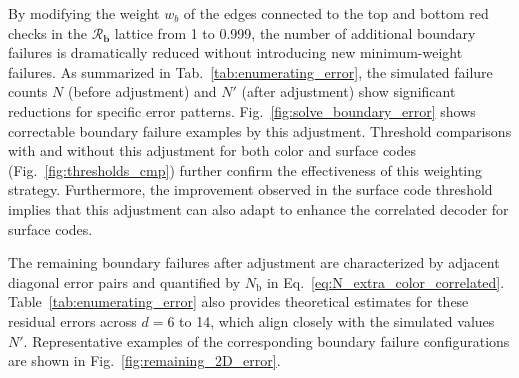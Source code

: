 \documentclass[%
 reprint,
 amsmath,amssymb,
 aps,
]{revtex4-2}
\begin{document}
By modifying the weight $w_b$ of the edges connected to the top and bottom red checks in the $\mathcal{R}_\mathbf{b}$ lattice from 1 to 0.999, the number of additional boundary failures is dramatically reduced without introducing new minimum-weight failures. As summarized in Tab.~\ref{tab:enumerating_error}, the simulated failure counts $N$ (before adjustment) and $N'$ (after adjustment) show significant reductions for specific error patterns. Fig.~\ref{fig:solve_boundary_error} shows correctable boundary failure examples by this adjustment. Threshold comparisons with and without this adjustment for both color and surface codes (Fig.~\ref{fig:thresholds_cmp}) further confirm the effectiveness of this weighting strategy. Furthermore, the improvement observed in the surface code threshold implies that this adjustment can also adapt to enhance the correlated decoder for surface codes. 

The remaining boundary failures after adjustment are characterized by adjacent diagonal error pairs and quantified by $N_{\textrm{b}}$ in Eq.~\ref{eq:N_extra_color_correlated}. Table~\ref{tab:enumerating_error} also provides theoretical estimates for these residual errors across $d=6$ to 14, which align closely with the simulated values $N'$. Representative examples of the corresponding boundary failure configurations are shown in Fig.~\ref{fig:remaining_2D_error}.
\end{document}
